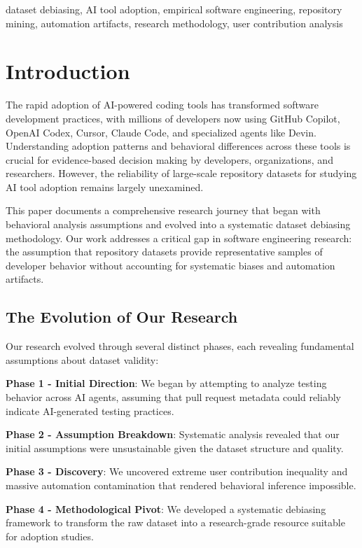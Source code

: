 \documentclass[conference]{IEEEtran}
\begin{document}
\begin{IEEEkeywords}
dataset debiasing, AI tool adoption, empirical software engineering, repository mining, automation artifacts, research methodology, user contribution analysis
\end{IEEEkeywords}

\section{Introduction}

The rapid adoption of AI-powered coding tools has transformed software development practices, with millions of developers now using GitHub Copilot, OpenAI Codex, Cursor, Claude Code, and specialized agents like Devin. Understanding adoption patterns and behavioral differences across these tools is crucial for evidence-based decision making by developers, organizations, and researchers. However, the reliability of large-scale repository datasets for studying AI tool adoption remains largely unexamined.

This paper documents a comprehensive research journey that began with behavioral analysis assumptions and evolved into a systematic dataset debiasing methodology. Our work addresses a critical gap in software engineering research: the assumption that repository datasets provide representative samples of developer behavior without accounting for systematic biases and automation artifacts.

\subsection{The Evolution of Our Research}

Our research evolved through several distinct phases, each revealing fundamental assumptions about dataset validity:

\textbf{Phase 1 - Initial Direction}: We began by attempting to analyze testing behavior across AI agents, assuming that pull request metadata could reliably indicate AI-generated testing practices.

\textbf{Phase 2 - Assumption Breakdown}: Systematic analysis revealed that our initial assumptions were unsustainable given the dataset structure and quality.

\textbf{Phase 3 - Discovery}: We uncovered extreme user contribution inequality and massive automation contamination that rendered behavioral inference impossible.

\textbf{Phase 4 - Methodological Pivot}: We developed a systematic debiasing framework to transform the raw dataset into a research-grade resource suitable for adoption studies.
\end{document}
